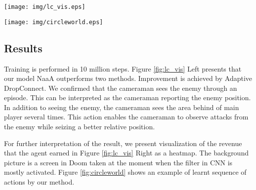 \begin{figure*}[t]
\centering
\texttt{[image: img/lc\_vis.eps]}
\caption{
	\textbf{Left:}
		Learning curve for the multi-agent task of VizDoom. 
		Our method based on NaaA outperforms the other two methods: baseline and Comm DQN.
	\textbf{Right:} 
		Reward visualization shows us what the cameraman sees:
		(a) The cameraman sees the pistol.
		(b) The cameraman sees the point which enemy appear and come closer.
}
\label{fig:lc_vis}
\end{figure*}

\begin{figure*}[t]
\centering
\texttt{[image: img/circleworld.eps]}
\caption{
NaaA leads the agents to obtain cooperative relationship.
First, the two agents are facing in different directions,
and the cameraman sells its information to the main player (\textbf{1}).
The main player who bought the information starts to turn right to find the enemy.
The cameraman who sold the information starts to turn left to seek new information by finding the blind area of the main player (\textbf{2} and \textbf{3}).
With turning, the main player attacks the first enemy which he already saw (\textbf{4} and \textbf{5}).
After the main player finds out the enemy, he attacks the enemy, and obtain the reward  (\textbf{6} and \textbf{7}).
Until the next enemy appears, the agents watch their dead area each other (\textbf{8}).
}
\label{fig:circleworld}
\end{figure*}

\subsection{Results}
Training is performed in 10 million steps.
Figure \ref{fig:lc_vis} Left presents that our model NaaA outperforms two methods.
Improvement is achieved by Adaptive DropConnect.
We confirmed that the cameraman sees the enemy through an episode.
This can be interpreted as the cameraman reporting the enemy position.
In addition to seeing the enemy, the cameraman sees the area behind of main player several times.
This action enables the cameraman to observe attacks from the enemy while seizing a better relative position.

For further interpretation of the result, 
we present visualization of the revenue that the agent earned in Figure \ref{fig:lc_vis} Right as a heatmap.
The background picture is a screen in Doom taken at the moment when the filter in CNN is mostly activated.
Figure \ref{fig:circleworld} shows an example of learnt sequence of actions by our method.


